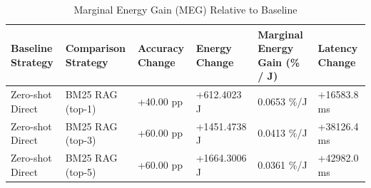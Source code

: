 \begin{table}
\caption{Marginal Energy Gain (MEG) Relative to Baseline}
\label{tab:marginal_energy_gain}
\begin{tabular}{llllll}
\toprule
Baseline Strategy & Comparison Strategy & Accuracy Change & Energy Change & Marginal Energy Gain (\% / J) & Latency Change \\
\midrule
Zero-shot Direct & BM25 RAG (top-1) & +40.00 pp & +612.4023 J & 0.0653 \%/J & +16583.8 ms \\
Zero-shot Direct & BM25 RAG (top-3) & +60.00 pp & +1451.4738 J & 0.0413 \%/J & +38126.4 ms \\
Zero-shot Direct & BM25 RAG (top-5) & +60.00 pp & +1664.3006 J & 0.0361 \%/J & +42982.0 ms \\
\bottomrule
\end{tabular}
\end{table}
